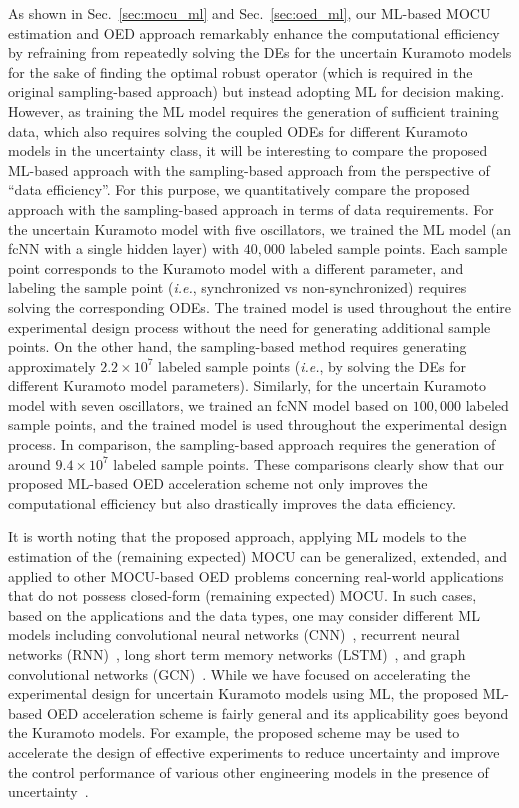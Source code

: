 \documentclass{article}
\begin{document}
As shown in Sec.~\ref{sec:mocu_ml} and Sec.~\ref{sec:oed_ml}, our ML-based MOCU estimation and OED approach remarkably enhance the computational efficiency by refraining from repeatedly solving the DEs for the uncertain Kuramoto models for the sake of finding the optimal robust operator (which is required in the original sampling-based approach) but instead adopting ML for decision making. However, as training the ML model requires the generation of sufficient training data, which also requires solving the coupled ODEs for different Kuramoto models in the uncertainty class, it will be interesting to compare the proposed ML-based approach with the sampling-based approach from the perspective of ``data efficiency''. For this purpose, we quantitatively compare the proposed approach with the sampling-based approach in terms of data requirements. For the uncertain Kuramoto model with five oscillators, we trained the ML model (an fcNN with a single hidden layer) with $40,000$ labeled sample points. Each sample point corresponds to the Kuramoto model with a different parameter, and labeling the sample point (\textit{i.e.}, synchronized vs non-synchronized) requires solving the corresponding ODEs. The trained model is used throughout the entire experimental design process without the need for generating additional sample points. On the other hand, the sampling-based method requires generating approximately $2.2\times 10^7$ labeled sample points (\textit{i.e.}, by solving the DEs for different Kuramoto model parameters). Similarly, for the uncertain Kuramoto model with seven oscillators, we trained an fcNN model based on $100,000$ labeled sample points, and the trained model is used throughout the experimental design process. In comparison, the sampling-based approach requires the generation of around $9.4\times 10^7$ labeled sample points. These comparisons clearly show that our proposed ML-based OED acceleration scheme not only improves the computational efficiency but also drastically improves the data efficiency.

It is worth noting that the proposed approach, applying ML models to the estimation of the (remaining expected) MOCU can be generalized, extended, and applied to other MOCU-based OED problems concerning real-world applications that do not possess closed-form (remaining expected) MOCU. In such cases, based on the applications and the data types, one may consider different ML models including convolutional neural networks (CNN)~\cite{fukushima1982neocognitron}, recurrent neural networks (RNN)~\cite{rumelhart1986learning}, long short term memory networks (LSTM)~\cite{hochreiter1997long}, and graph convolutional networks (GCN)~\cite{scarselli2008graph}. While we have focused on accelerating the experimental design for uncertain Kuramoto models using ML, the proposed ML-based OED acceleration scheme is fairly general and its applicability goes beyond the Kuramoto models. For example, the proposed scheme may be used to accelerate the design of effective experiments to reduce uncertainty and improve the control performance of various other engineering models in the presence of uncertainty~\cite{tao2020robust,tao2021robust,zhang2021asynchronous,xin2022online}.
\end{document}
